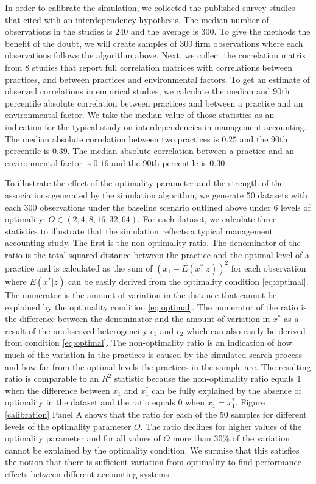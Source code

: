 \documentclass[12pt]{article}
\begin{document}
In order to calibrate the simulation, we collected the published survey studies that cited \citet{Grabner2013} with an interdependency hypothesis. The median number of observations in the studies is 240 and the average is 300. To give the methods the benefit of the doubt, we will create samples of 300 firm observations where each observations follows the algorithm above. Next, we collect the correlation matrix from 8 studies \citep{Dekker2016, Grabner2016, Bedford2015, Heinicke2016,Bedford2018PerformanceFirms, Abernethy2015a,Sponem2016ExploringApproach, Samagaio2018ManagementInvestigation} that report full correlation matrices with correlations between practices, and between practices and environmental factors. To get an estimate of observed correlations in empirical studies, we calculate the median and 90th percentile absolute correlation between practices and between a practice and an environmental factor. We take the median value of those statistics as an indication for the typical study on interdependencies in management accounting. The median absolute correlation between two practices is $0.25$ and the 90th percentile is $0.39$. The median absolute correlation between a practice and an environmental factor is $0.16$ and the 90th percentile is $0.30$.

To illustrate the effect of the optimality parameter and the strength of the associations generated by the simulation algorithm, we generate 50 datasets with each 300 observations under the baseline scenario outlined above under 6 levels of optimality: $O \in  (2, 4, 8, 16, 32, 64)$. For each dataset, we calculate three statistics to illustrate that the simulation reflects a typical management accounting study. The first is the non-optimality ratio. The denominator of the ratio is the total squared distance between the practice and the optimal level of a practice and is calculated as the sum of $(x_1 - E(x_1^*|z))^2$ for each observation where $E(x^*|z)$ can be easily derived from the optimality condition \eqref{eq:optimal}. The numerator is the amount of variation in the distance that cannot be explained by the optimality condition \ref{eq:optimal}. The numerator of the ratio is the difference between the denominator and the amount of variation in $x^*_1$ as a result of the unobserved heterogeneity $\epsilon_1$ and $\epsilon_2$ which can also easily be derived from condition \eqref{eq:optimal}.
The non-optimality ratio is an indication of how much of the variation in the practices is caused by the simulated search process and how far from the optimal levels the practices in the sample are.  The resulting ratio is comparable to an $R^2$ statistic because the non-optimality ratio equals 1 when the difference between $x_1$ and $x^*_1$ can be fully explained by the absence of optimality in the dataset and the ratio equals 0 when $x_1 = x^*_1$. Figure \ref{calibration} Panel A shows that the ratio for each of the 50 samples for different levels of the optimality parameter $O$. The ratio declines for higher values of the optimality parameter and for all values of  $O$ more than $30\%$ of the variation cannot be explained by the optimality condition. We surmise that this satisfies the notion that there is sufficient variation from optimality to find performance effects between different accounting systems.
\end{document}
